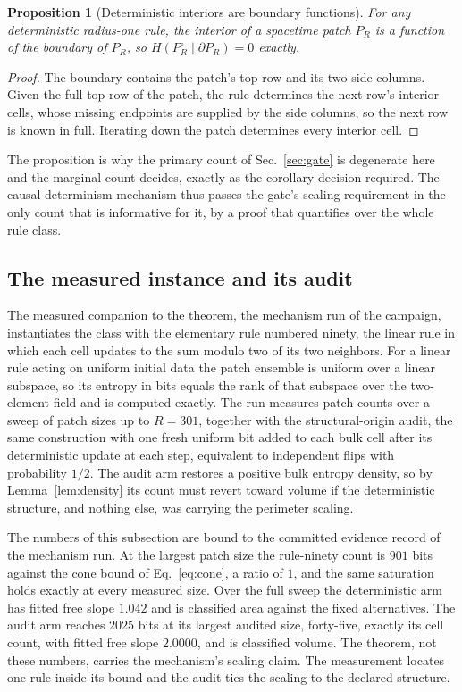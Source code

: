 \documentclass[aps,pre,reprint,nofootinbib]{revtex4-2}
\newtheorem{proposition}{Proposition}
\newcommand{\egbRmax}{301}               %
\newcommand{\egbRankNinety}{901}       %
\newcommand{\egbConeRatioNinety}{1} %
\newcommand{\egbSlopeDet}{1.042}       %
\newcommand{\egbClassDet}{area}       %
\newcommand{\egbNoiseRate}{1/2}     %
\newcommand{\egbNoisyRank}{2025}     %
\newcommand{\egbSlopeNoisy}{2.0000}   %
\newcommand{\egbClassNoisy}{volume}   %
\begin{document}
\begin{proposition}[Deterministic interiors are boundary functions]
\label{prop:interior}
For any deterministic radius-one rule, the interior of a spacetime patch
$P_R$ is a function of the boundary of $P_R$, so
$H(P_R^{\circ} \mid \partial P_R) = 0$ exactly.
\end{proposition}

\begin{proof}
The boundary contains the patch's top row and its two side columns.
Given the full top row of the patch, the rule determines the next row's
interior cells, whose missing endpoints are supplied by the side
columns, so the next row is known in full.  Iterating down the patch
determines every interior cell.
\end{proof}

The proposition is why the primary count of Sec.~\ref{sec:gate} is
degenerate here and the marginal count decides, exactly as the corollary
decision required.  The causal-determinism mechanism thus passes the
gate's scaling requirement in the only count that is informative for it,
by a proof that quantifies over the whole rule class.

\subsection{The measured instance and its audit}

The measured companion to the theorem, the mechanism run of the
campaign, instantiates the class with the elementary rule numbered
ninety, the linear rule in which each cell updates to the sum modulo two
of its two neighbors.  For a linear rule acting on uniform initial data
the patch ensemble is uniform over a linear subspace, so its entropy in
bits equals the rank of that subspace over the two-element field and is
computed exactly.  The run measures patch counts over a sweep of patch
sizes up to $R = \egbRmax$, together with the structural-origin audit,
the same construction with one fresh uniform bit added to each bulk
cell after its deterministic update at each step, equivalent to
independent flips with probability $\egbNoiseRate$.  The audit
arm restores a positive bulk entropy density, so by
Lemma~\ref{lem:density} its count must revert toward volume if the
deterministic structure, and nothing else, was carrying the perimeter
scaling.

The numbers of this subsection are bound to the committed evidence
record of the mechanism run.  At the largest patch size the rule-ninety
count is $\egbRankNinety$ bits against the cone bound of
Eq.~\eqref{eq:cone}, a ratio of $\egbConeRatioNinety$, and the same
saturation holds exactly at every measured size.  Over the full
sweep the deterministic arm has fitted free slope $\egbSlopeDet$ and is
classified \egbClassDet{} against the fixed alternatives.  The audit arm
reaches $\egbNoisyRank$ bits at its largest audited size, forty-five,
exactly its cell count, with fitted free
slope $\egbSlopeNoisy$, and is classified \egbClassNoisy{}.  The
theorem, not these numbers, carries the mechanism's scaling claim.  The
measurement locates one rule inside its bound and the audit ties the
scaling to the declared structure.
\end{document}
